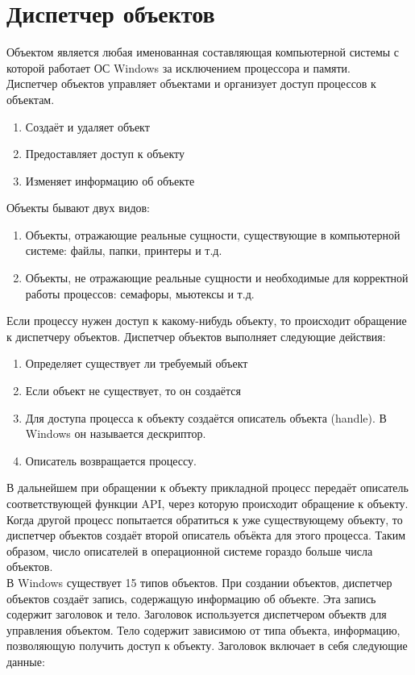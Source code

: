 \documentclass[a4paper]{article}
\begin{document}
\section{Диспетчер объектов}
\setcounter{subsection}{0}
Объектом является любая именованная составляющая компьютерной системы с которой работает ОС Windows за исключением процессора и памяти.\\
Диспетчер объектов управляет объектами и организует доступ процессов к объектам.
\begin{enumerate}
        \item Создаёт и удаляет объект
	\item Предоставляет доступ к объекту
	\item Изменяет информацию об объекте
\end{enumerate}
Объекты бывают двух видов:
\begin{enumerate}
        \item Объекты, отражающие реальные сущности, существующие в компьютерной системе: файлы, папки, принтеры и т.д.
	\item Объекты, не отражающие реальные сущности и необходимые для корректной работы процессов: семафоры, мьютексы и т.д.
\end{enumerate}
Если процессу нужен доступ к какому-нибудь объекту, то происходит обращение к диспетчеру объектов. Диспетчер объектов выполняет следующие действия:
\begin{enumerate}
        \item Определяет существует ли требуемый объект
	\item Если объект не существует, то он создаётся
	\item Для доступа процесса к объекту создаётся описатель объекта (handle). В Windows он называется дескриптор.
	\item Описатель возвращается процессу. 
\end{enumerate}
В дальнейшем при обращении к объекту прикладной процесс передаёт описатель соответствующей функции API, через которую происходит обращение к объекту.\\
Когда другой процесс попытается обратиться к уже существующему объекту, то диспетчер объектов создаёт второй описатель объёкта для этого процесса. Таким образом, число описателей в операционной системе гораздо больше числа объектов.\\
В Windows существует 15 типов объектов. При создании объектов, диспетчер объектов создаёт запись, содержащую информацию об объекте. Эта запись содержит заголовок и тело. Заголовок используется диспетчером объектв для управления объектом. Тело содержит зависимою от типа объекта, информацию, позволяющую получить доступ к объекту. Заголовок включает в себя следующие данные:
\end{document}
